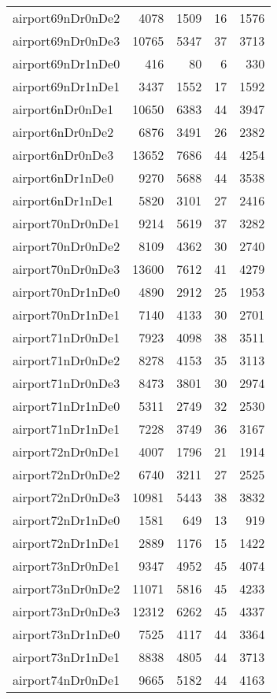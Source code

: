 \documentclass[../../../thesis.tex]{subfiles}
\begin{document}
\begin{longtable}{lrrrr}
airport69nDr0nDe2 & 4078 & 1509 & 16 & 1576 \\
airport69nDr0nDe3 & 10765 & 5347 & 37 & 3713 \\
airport69nDr1nDe0 & 416 & 80 & 6 & 330 \\
airport69nDr1nDe1 & 3437 & 1552 & 17 & 1592 \\
airport6nDr0nDe1 & 10650 & 6383 & 44 & 3947 \\
airport6nDr0nDe2 & 6876 & 3491 & 26 & 2382 \\
airport6nDr0nDe3 & 13652 & 7686 & 44 & 4254 \\
airport6nDr1nDe0 & 9270 & 5688 & 44 & 3538 \\
airport6nDr1nDe1 & 5820 & 3101 & 27 & 2416 \\
airport70nDr0nDe1 & 9214 & 5619 & 37 & 3282 \\
airport70nDr0nDe2 & 8109 & 4362 & 30 & 2740 \\
airport70nDr0nDe3 & 13600 & 7612 & 41 & 4279 \\
airport70nDr1nDe0 & 4890 & 2912 & 25 & 1953 \\
airport70nDr1nDe1 & 7140 & 4133 & 30 & 2701 \\
airport71nDr0nDe1 & 7923 & 4098 & 38 & 3511 \\
airport71nDr0nDe2 & 8278 & 4153 & 35 & 3113 \\
airport71nDr0nDe3 & 8473 & 3801 & 30 & 2974 \\
airport71nDr1nDe0 & 5311 & 2749 & 32 & 2530 \\
airport71nDr1nDe1 & 7228 & 3749 & 36 & 3167 \\
airport72nDr0nDe1 & 4007 & 1796 & 21 & 1914 \\
airport72nDr0nDe2 & 6740 & 3211 & 27 & 2525 \\
airport72nDr0nDe3 & 10981 & 5443 & 38 & 3832 \\
airport72nDr1nDe0 & 1581 & 649 & 13 & 919 \\
airport72nDr1nDe1 & 2889 & 1176 & 15 & 1422 \\
airport73nDr0nDe1 & 9347 & 4952 & 45 & 4074 \\
airport73nDr0nDe2 & 11071 & 5816 & 45 & 4233 \\
airport73nDr0nDe3 & 12312 & 6262 & 45 & 4337 \\
airport73nDr1nDe0 & 7525 & 4117 & 44 & 3364 \\
airport73nDr1nDe1 & 8838 & 4805 & 44 & 3713 \\
airport74nDr0nDe1 & 9665 & 5182 & 44 & 4163 \\

\end{longtable}
\end{document}
